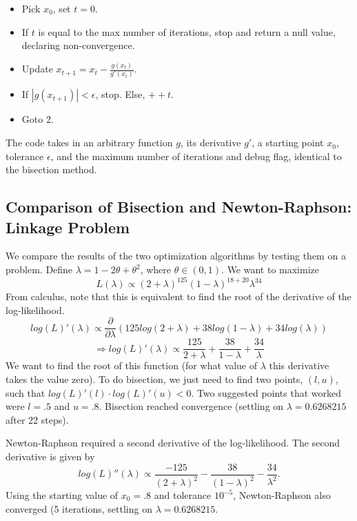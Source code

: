 \documentclass[12pt]{article}
\begin{document}
\begin{itemize}
\item Pick $x_0$, set $t = 0$.
\item If $t$ is equal to the max number of iterations, stop and return a null value, declaring non-convergence.
\item Update $x_{t+1} = x_t - \frac{g(x_t)}{g'(x_t)}$.
\item If $|g(x_{t+1})| < \epsilon$, stop. Else, $++t$.
\item Goto 2.
\end{itemize}
The code takes in an arbitrary function $g$, its derivative $g'$, a starting point $x_0$, tolerance $\epsilon$, and the maximum number of iterations and debug flag, identical to the bisection method.

\subsection*{Comparison of Bisection and Newton-Raphson: Linkage Problem}
We compare the results of the two optimization algorithms by testing them on a problem. Define $\lambda = 1 - 2\theta + \theta^2$, where $\theta \in (0,1)$. We want to maximize 
\[ L(\lambda) \propto (2+\lambda)^{125} (1-\lambda)^{18+20} \lambda^{34} \]
From calculus, note that this is equivalent to find the root of the derivative of the log-likelihood.
\[ log(L)' (\lambda) \propto \frac{\partial}{\partial \lambda} \left( 125 log(2+\lambda) + 38 log(1-\lambda) + 34 log(\lambda) \right) \]
\[ \Rightarrow log(L)' (\lambda) \propto \frac{125}{2+\lambda} + \frac{38}{1-\lambda} + \frac{34}{\lambda} \]
We want to find the root of this function (for what value of $\lambda$ this derivative takes the value zero). To do bisection, we just need to find two points, $(l, u)$, such that $log(L)'(l) \cdot log(L)'(u) < 0$.  Two suggested points that worked were $l= .5$ and $u=.8$. Bisection reached convergence (settling on $\lambda = 0.6268215$ after 22 steps).

Newton-Raphson required a second derivative of the log-likelihood. The second derivative is given by
\[ log(L)''(\lambda) \propto \frac{-125}{(2+\lambda)^2} - \frac{38}{(1-\lambda)^2} - \frac{34}{\lambda^2}. \]
Using the starting value of $x_0 = .8$ and tolerance $10^{-5}$, Newton-Raphson also converged (5 iterations, settling on $\lambda = 0.6268215$. 
\end{document}
